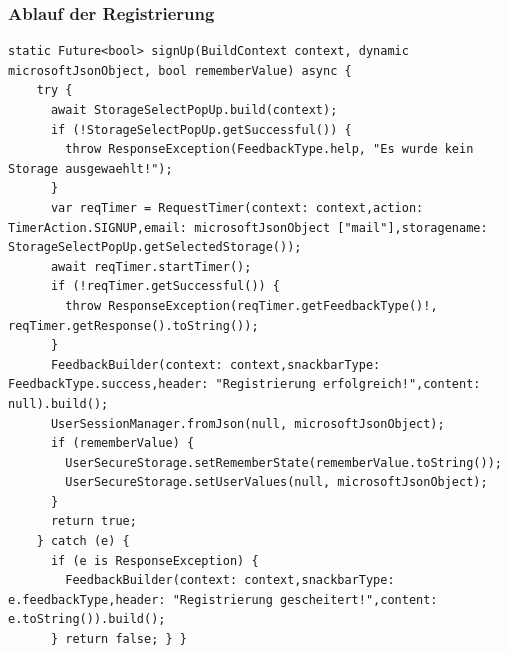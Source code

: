 {{\subsubsection{Ablauf der Registrierung}

\begin{lstlisting}[caption= Codeauschnitt der Registrierung,style=goMono]
  static Future<bool> signUp(BuildContext context, dynamic microsoftJsonObject, bool rememberValue) async {
    try {
      await StorageSelectPopUp.build(context);
      if (!StorageSelectPopUp.getSuccessful()) {
        throw ResponseException(FeedbackType.help, "Es wurde kein Storage ausgewaehlt!");
      }
      var reqTimer = RequestTimer(context: context,action: TimerAction.SIGNUP,email: microsoftJsonObject ["mail"],storagename: StorageSelectPopUp.getSelectedStorage());
      await reqTimer.startTimer();
      if (!reqTimer.getSuccessful()) {
        throw ResponseException(reqTimer.getFeedbackType()!, reqTimer.getResponse().toString());
      }
      FeedbackBuilder(context: context,snackbarType: FeedbackType.success,header: "Registrierung erfolgreich!",content: null).build();
      UserSessionManager.fromJson(null, microsoftJsonObject);
      if (rememberValue) {
        UserSecureStorage.setRememberState(rememberValue.toString());
        UserSecureStorage.setUserValues(null, microsoftJsonObject);
      }
      return true;
    } catch (e) {
      if (e is ResponseException) {
        FeedbackBuilder(context: context,snackbarType: e.feedbackType,header: "Registrierung gescheitert!",content: e.toString()).build();
      } return false; } }
\end{lstlisting}

}}
